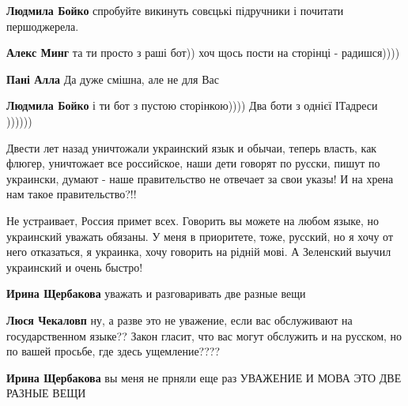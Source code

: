 \begin{itemize}
\begin{itemize}
\textbf{Людмила Бойко} спробуйте викинуть совєцькі підручники і почитати першоджерела.

\textbf{Алекс Минг} та ти просто з раші бот)) хоч щось пости на сторінці - радишся))))

\textbf{Пані Алла} Да дуже смішна, але не для Вас

\textbf{Людмила Бойко} і ти бот з пустою сторінкою))))
Два боти з однієї ІТадреси ))))))

\end{itemize}


Двести лет назад уничтожали украинский язык и обычаи, теперь власть, как
флюгер, уничтожает все российское, наши дети говорят по русски, пишут по
украински, думают - наше правительство не отвечает за свои указы! И на хрена
нам такое правительство?!!


Не устраивает, Россия примет всех. Говорить вы можете на любом языке, но
украинский уважать обязаны. У меня в приоритете, тоже, русский, но я хочу от
него отказаться, я украинка, хочу говорить на рідній мові. А Зеленский выучил
украинский и очень быстро!

\begin{itemize}
\textbf{Ирина Щербакова} уважать и разговаривать две разные вещи

\textbf{Люся Чекаловп} ну, а разве это не уважение, если вас обслуживают на государственном языке?? Закон гласит, что вас могут обслужить и на русском, но по вашей просьбе, где здесь ущемление????

\textbf{Ирина Щербакова} вы меня не прняли еще раз УВАЖЕНИЕ И МОВА ЭТО ДВЕ РАЗНЫЕ ВЕЩИ


\end{itemize}
\end{itemize}
